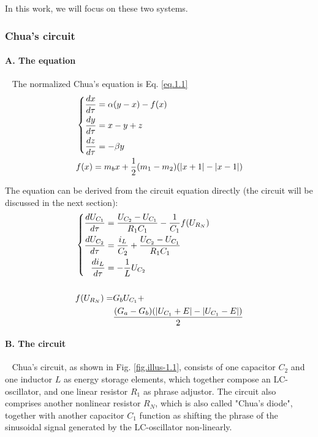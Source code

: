 \documentclass[10pt,a4paper,twocolumn,twoside,UTF8]{article}
\begin{document}
		In this work, we will focus on these two systems.
		\subsubsection{Chua's circuit}
		\paragraph{A. The equation}~
		\newline 
		\indent
		The normalized Chua's equation is Eq. \ref{eq.1.1}
		\begin{align}
			&\left\{
				\begin{aligned}
					\frac{dx}{d \tau} &= \alpha(y-x)-f(x) \\
					\frac{dy}{d \tau} &= x-y+z \\
					\frac{dz}{d \tau} &= -\beta y
					\notag
				\end{aligned}
			\right. \\
			&f(x) = m_bx+\frac{1}{2}(m_1-m_2)(|x+1|-|x-1|)
			\label{eq.1.1}
		\end{align}

		The equation can be derived from the circuit equation directly (the circuit will be discussed in the next section):
		\begin{align}
			&\left\{
				\begin{aligned}
					\frac{dU_{C_1}}{d \tau} &= \frac{U_{C_2} - U_{C_1}}{R_1 C_1}-\frac{1}{C_1} f(U_{R_N}) \\
					\frac{dU_{C_2}}{d \tau} &= \frac{i_L}{C_2} + \frac{U_{C_2} - U_{C_1}}{R_1 C_1} \\
					\frac{di_L}{d \tau} &= -\frac{1}{L} U_{C_2} 
					\notag
				\end{aligned}
			\right. \\ \notag
			\\ 
			&
			{\begin{aligned}
			    f(U_{R_N}) = &G_b U_{C_1} + \\
			&\frac{(G_a - G_b) (|U_{C_1}+E|-|U_{C_1}-E|)}{2}
			\end{aligned}}
			\label{eq.1.2} 
		\end{align}
		
		\paragraph{B. The circuit\autocite{shenGeneralPhysicsLaboratory2015}\autocite{prakashChuaCircuitParadigm2020}}~
		\newline 
		\indent
		Chua's circuit, as shown in Fig. \ref{fig.illus-1.1}, consists of one capacitor $C_2$ and one inductor $L$ as energy storage elements, which together compose an LC-oscillator, and one linear resistor $R_1$ as phrase adjustor. 
		The circuit also comprises another nonlinear resistor $R_N$, which is also called "Chua's diode", together with another capacitor $C_1$ function as shifting the phrase of the sinusoidal signal generated by the LC-oscillator non-linearly.
\end{document}
